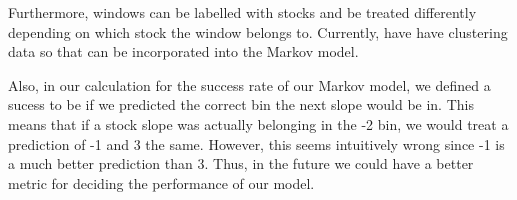 \documentclass[final]{article}
\begin{document}
Furthermore, windows can be labelled with stocks and be treated
differently depending on which stock the window belongs to. Currently,
have have clustering data so that can be incorporated into the Markov
model.

Also, in our calculation for the success rate of our Markov model, we
defined a sucess to be if we predicted the correct bin the next slope
would be in. This means that if a stock slope was actually belonging
in the -2 bin, we would treat a prediction of -1 and 3 the same.
However, this seems intuitively wrong since -1 is a much better
prediction than 3. Thus, in the future we could have a better metric
for deciding the performance of our model.
\end{document}
